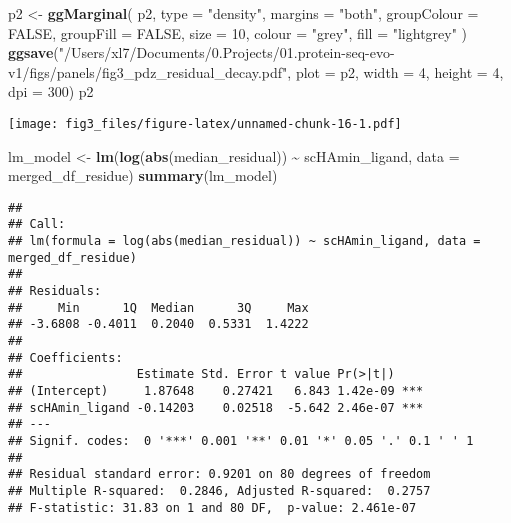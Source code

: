 \documentclass[
]{article}
\newenvironment{Shaded}{\begin{snugshade}}{\end{snugshade}}
\newcommand{\AttributeTok}[1]{\textcolor[rgb]{0.13,0.29,0.53}{#1}}
\newcommand{\ConstantTok}[1]{\textcolor[rgb]{0.56,0.35,0.01}{#1}}
\newcommand{\DecValTok}[1]{\textcolor[rgb]{0.00,0.00,0.81}{#1}}
\newcommand{\FunctionTok}[1]{\textcolor[rgb]{0.13,0.29,0.53}{\textbf{#1}}}
\newcommand{\NormalTok}[1]{#1}
\newcommand{\OtherTok}[1]{\textcolor[rgb]{0.56,0.35,0.01}{#1}}
\newcommand{\SpecialCharTok}[1]{\textcolor[rgb]{0.81,0.36,0.00}{\textbf{#1}}}
\newcommand{\StringTok}[1]{\textcolor[rgb]{0.31,0.60,0.02}{#1}}
\begin{document}
\begin{Shaded}
\begin{Highlighting}[]
\NormalTok{p2 }\OtherTok{\textless{}{-}} \FunctionTok{ggMarginal}\NormalTok{(}
\NormalTok{  p2,}
  \AttributeTok{type =} \StringTok{"density"}\NormalTok{,}
  \AttributeTok{margins =} \StringTok{"both"}\NormalTok{,}
  \AttributeTok{groupColour =} \ConstantTok{FALSE}\NormalTok{,}
  \AttributeTok{groupFill =} \ConstantTok{FALSE}\NormalTok{,}
  \AttributeTok{size =} \DecValTok{10}\NormalTok{,}
  \AttributeTok{colour =} \StringTok{"grey"}\NormalTok{,}
  \AttributeTok{fill =} \StringTok{"lightgrey"}
\NormalTok{)}
\FunctionTok{ggsave}\NormalTok{(}\StringTok{"/Users/xl7/Documents/0.Projects/01.protein{-}seq{-}evo{-}v1/figs/panels/fig3\_pdz\_residual\_decay.pdf"}\NormalTok{, }
       \AttributeTok{plot =}\NormalTok{ p2, }\AttributeTok{width =} \DecValTok{4}\NormalTok{, }\AttributeTok{height =} \DecValTok{4}\NormalTok{, }\AttributeTok{dpi =} \DecValTok{300}\NormalTok{)}
\NormalTok{p2}
\end{Highlighting}
\end{Shaded}

\texttt{[image: fig3\_files/figure-latex/unnamed-chunk-16-1.pdf]}

\begin{Shaded}
\begin{Highlighting}[]
\NormalTok{lm\_model }\OtherTok{\textless{}{-}} \FunctionTok{lm}\NormalTok{(}\FunctionTok{log}\NormalTok{(}\FunctionTok{abs}\NormalTok{(median\_residual)) }\SpecialCharTok{\textasciitilde{}}\NormalTok{ scHAmin\_ligand, }\AttributeTok{data =}\NormalTok{ merged\_df\_residue)}
\FunctionTok{summary}\NormalTok{(lm\_model)}
\end{Highlighting}
\end{Shaded}

\begin{verbatim}
## 
## Call:
## lm(formula = log(abs(median_residual)) ~ scHAmin_ligand, data = merged_df_residue)
## 
## Residuals:
##     Min      1Q  Median      3Q     Max 
## -3.6808 -0.4011  0.2040  0.5331  1.4222 
## 
## Coefficients:
##                Estimate Std. Error t value Pr(>|t|)    
## (Intercept)     1.87648    0.27421   6.843 1.42e-09 ***
## scHAmin_ligand -0.14203    0.02518  -5.642 2.46e-07 ***
## ---
## Signif. codes:  0 '***' 0.001 '**' 0.01 '*' 0.05 '.' 0.1 ' ' 1
## 
## Residual standard error: 0.9201 on 80 degrees of freedom
## Multiple R-squared:  0.2846, Adjusted R-squared:  0.2757 
## F-statistic: 31.83 on 1 and 80 DF,  p-value: 2.461e-07
\end{verbatim}
\end{document}
